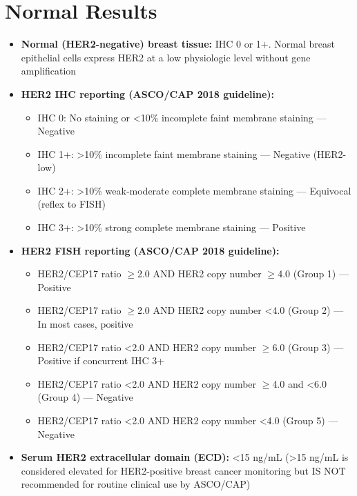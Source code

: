 \section*{Normal Results}
\begin{itemize}
  \item \textbf{Normal (HER2-negative) breast tissue:} IHC 0 or 1+. Normal breast epithelial cells express HER2 at a low physiologic level without gene amplification
  \item \textbf{HER2 IHC reporting (ASCO/CAP 2018 guideline):}
  \begin{itemize}
    \item IHC 0: No staining or <10\% incomplete faint membrane staining --- Negative
    \item IHC 1+: >10\% incomplete faint membrane staining --- Negative (HER2-low)
    \item IHC 2+: >10\% weak-moderate complete membrane staining --- Equivocal (reflex to FISH)
    \item IHC 3+: >10\% strong complete membrane staining --- Positive
  \end{itemize}
  \item \textbf{HER2 FISH reporting (ASCO/CAP 2018 guideline):}
  \begin{itemize}
    \item HER2/CEP17 ratio $\geq$2.0 AND HER2 copy number $\geq$4.0 (Group 1) --- Positive
    \item HER2/CEP17 ratio $\geq$2.0 AND HER2 copy number <4.0 (Group 2) --- In most cases, positive
    \item HER2/CEP17 ratio <2.0 AND HER2 copy number $\geq$6.0 (Group 3) --- Positive if concurrent IHC 3+
    \item HER2/CEP17 ratio <2.0 AND HER2 copy number $\geq$4.0 and <6.0 (Group 4) --- Negative
    \item HER2/CEP17 ratio <2.0 AND HER2 copy number <4.0 (Group 5) --- Negative
  \end{itemize}
  \item \textbf{Serum HER2 extracellular domain (ECD):} <15 ng/mL (>15 ng/mL is considered elevated for HER2-positive breast cancer monitoring but IS NOT recommended for routine clinical use by ASCO/CAP)
\end{itemize}

